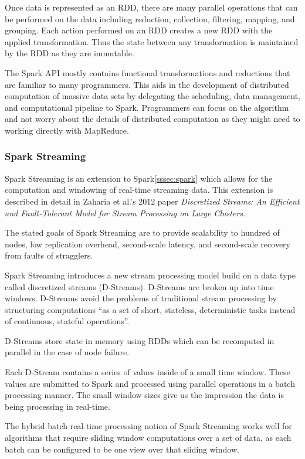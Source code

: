 \documentclass[]{article}
\begin{document}
Once data is represented as an RDD, there are many parallel operations that can be performed on the data including reduction, collection, filtering, mapping, and grouping. Each action performed on an RDD creates a new RDD with the applied transformation. Thus the state between any transformation is maintained by the RDD as they are immutable.

The Spark API mostly contains functional transformations and reductions that are familiar to many programmers. This aids in the development of distributed computation of massive data sets by delegating the scheduling, data management, and computational pipeline to Spark. Programmers can focus on the algorithm and not worry about the details of distributed computation as they might need to working directly with MapReduce.

\subsubsection{Spark Streaming}\label{sssec:spark-streaming}
Spark Streaming is an extension to Spark\ref{sssec:spark} which allows for the computation and windowing of real-time streaming data. This extension is described in detail in Zaharia et al.'s 2012 paper \textit{Discretized Streams: An Efficient and Fault-Tolerant Model for Stream Processing on Large Clusters}\cite{zaharia2012discretized}.

The stated goals of Spark Streaming are to provide scalability to hundred of nodes, low replication overhead, second-scale latency, and second-scale recovery from faults of stragglers.

Spark Streaming introduces a new stream processing model build on a data type called discretized streams (D-Streams). D-Streams are broken up into time windows. D-Streams avoid the problems of traditional stream processing by structuring computations ``as a set of short, stateless, deterministic tasks instead of continuous, stateful operations''.

D-Streams store state in memory using RDDs which can be recomputed in parallel in the case of node failure. 

Each D-Stream contains a series of values inside of a small time window. These values are submitted to Spark and processed using parallel operations in a batch processing manner. The small window sizes give us the impression the data is being processing in real-time.

The hybrid batch real-time processing notion of Spark Streaming works well for algorithms that require sliding window computations over a set of data, as each batch can be configured to be one view over that sliding window.
\end{document}
